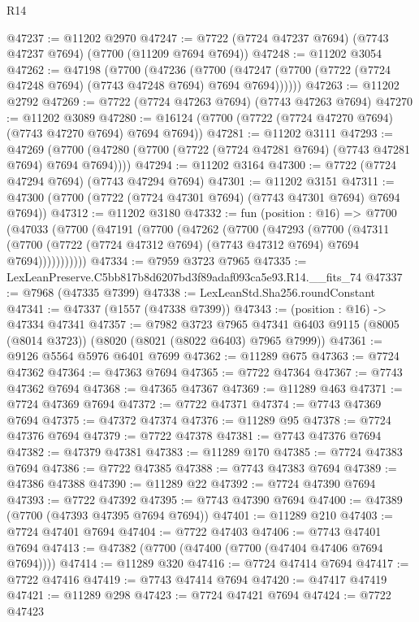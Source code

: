 \begin{lexlean}{R14}
\begin{coremodule}
@47237 := @11202 @2970
@47247 := @7722 (@7724 @47237 @7694) (@7743 @47237 @7694) (@7700 (@11209 @7694 @7694))
@47248 := @11202 @3054
@47262 := @47198
    (@7700
      (@47236
        (@7700 (@47247 (@7700 (@7722 (@7724 @47248 @7694) (@7743 @47248 @7694) @7694 @7694))))))
@47263 := @11202 @2792
@47269 := @7722 (@7724 @47263 @7694) (@7743 @47263 @7694)
@47270 := @11202 @3089
@47280 := @16124 (@7700 (@7722 (@7724 @47270 @7694) (@7743 @47270 @7694) @7694 @7694))
@47281 := @11202 @3111
@47293 := @47269
    (@7700 (@47280 (@7700 (@7722 (@7724 @47281 @7694) (@7743 @47281 @7694) @7694 @7694))))
@47294 := @11202 @3164
@47300 := @7722 (@7724 @47294 @7694) (@7743 @47294 @7694)
@47301 := @11202 @3151
@47311 := @47300 (@7700 (@7722 (@7724 @47301 @7694) (@7743 @47301 @7694) @7694 @7694))
@47312 := @11202 @3180
@47332 := fun (position : @16) =>
  @7700
    (@47033
      (@7700
        (@47191
          (@7700
            (@47262
              (@7700
                (@47293
                  (@7700
                    (@47311
                      (@7700 (@7722 (@7724 @47312 @7694) (@7743 @47312 @7694) @7694 @7694)))))))))))
@47334 := @7959 @3723 @7965
@47335 := LexLeanPreserve.C5bb817b8d6207bd3f89adaf093ca5e93.R14.__fits_74
@47337 := @7968 (@47335 @7399)
@47338 := LexLeanStd.Sha256.roundConstant
@47341 := @47337 (@1557 (@47338 @7399))
@47343 := (position : @16) -> @47334 @47341
@47357 := @7982
    @3723
    @7965
    @47341
    @6403
    @9115
    (@8005 (@8014 @3723))
    (@8020 (@8021 (@8022 @6403) @7965 @7999))
@47361 := @9126 @5564 @5976 @6401 @7699
@47362 := @11289 @675
@47363 := @7724 @47362
@47364 := @47363 @7694
@47365 := @7722 @47364
@47367 := @7743 @47362 @7694
@47368 := @47365 @47367
@47369 := @11289 @463
@47371 := @7724 @47369 @7694
@47372 := @7722 @47371
@47374 := @7743 @47369 @7694
@47375 := @47372 @47374
@47376 := @11289 @95
@47378 := @7724 @47376 @7694
@47379 := @7722 @47378
@47381 := @7743 @47376 @7694
@47382 := @47379 @47381
@47383 := @11289 @170
@47385 := @7724 @47383 @7694
@47386 := @7722 @47385
@47388 := @7743 @47383 @7694
@47389 := @47386 @47388
@47390 := @11289 @22
@47392 := @7724 @47390 @7694
@47393 := @7722 @47392
@47395 := @7743 @47390 @7694
@47400 := @47389 (@7700 (@47393 @47395 @7694 @7694))
@47401 := @11289 @210
@47403 := @7724 @47401 @7694
@47404 := @7722 @47403
@47406 := @7743 @47401 @7694
@47413 := @47382 (@7700 (@47400 (@7700 (@47404 @47406 @7694 @7694))))
@47414 := @11289 @320
@47416 := @7724 @47414 @7694
@47417 := @7722 @47416
@47419 := @7743 @47414 @7694
@47420 := @47417 @47419
@47421 := @11289 @298
@47423 := @7724 @47421 @7694
@47424 := @7722 @47423

\end{coremodule}
\end{lexlean}
